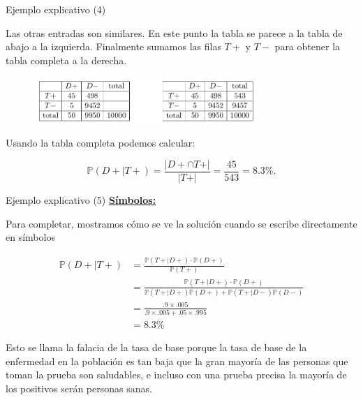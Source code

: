 \documentclass[10pt]{beamer}
\begin{document}
\begin{frame}{Ejemplo explicativo (4)}
\small{Las otras entradas son similares. En este punto la tabla se parece a la tabla de abajo a la izquierda. Finalmente sumamos las filas $T+$ y $T-$ para obtener la tabla completa a la derecha.

\begin{figure}[h]
	\centering
	\includegraphics[width=8.5cm]{g9}
\end{figure}

Usando la tabla completa podemos calcular:

\[
\mathbb{P}(D+|T +) = \frac{\vert D+ \cap T+\vert }{\vert T+ \vert} = \frac{45}{543} = 8.3\%.
\]
}
\end{frame}
\begin{frame}{Ejemplo explicativo (5)}
\small\underline{\textbf{S\'imbolos:}}{ Para completar, mostramos c\'omo se ve la soluci\'on cuando se escribe directamente en s\'imbolos

\begin{align*}
\mathbb{P}(D+|T +)  &=  \frac{\mathbb{P}(T+|D +)\cdot \mathbb{P}(D+ )}{\mathbb{P}(T+)} \\
					&= \frac{\mathbb{P}(T+|D +)\cdot \mathbb{P}(D+ )}{\mathbb{P}(T+|D+)\mathbb{P}(D+)+ \mathbb{P}(T+|D-)\mathbb{P}(D-)}\\
					&= \frac{.9 \times .005}{.9 \times .005 + .05 \times .995}\\
					&= 8.3\%
\end{align*}	
}

\scriptsize{Esto se llama la falacia de la tasa de base porque la tasa de base de la enfermedad en la poblaci\'on es tan baja que la gran mayor\'ia de las personas que toman la prueba son saludables, e incluso con una prueba precisa la mayor\'ia de los positivos ser\'an personas sanas.}	
\end{frame}
\end{document}
